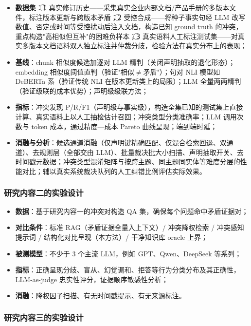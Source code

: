 \begin{itemize}
  \item \textbf{数据集}：\textcircled{1} 真实修订历史——采集真实企业内部文档/产品手册的多版本文件，标注版本更新与跨版本矛盾；\textcircled{2} 受控合成——将种子事实句经 LLM 改写数值、否定或时间等受控扰动后注入文档，构造已知 ground truth 的冲突，重点构造"高相似但互补"的困难负样本；\textcircled{3} 真实语料人工标注测试集——对真实多版本文档语料双人独立标注并仲裁分歧，检验方法在真实分布上的表现；
  \item \textbf{基线}：chunk 相似度候选加逐对 LLM 精判（关闭声明抽取的退化形态）；embedding 相似度阈值直判（验证"相似$\neq$矛盾"）；句对 NLI 模型如 DeBERTa 系（验证传统 NLI 在版本更新类上的局限）；LLM 全量两两精判（验证级联的成本优势）；声明级级联方法；
  \item \textbf{指标}：冲突发现 P/R/F1（声明级与事实级），构造全集已知的测试集上直接计算、真实语料上以人工抽检估计召回；冲突类型分类准确率；LLM 调用次数与 token 成本，通过精度—成本 Pareto 曲线呈现；端到端时延；
  \item \textbf{消融与分析}：候选通道消融（仅声明键精确匹配、仅混合检索回退、双通道）、去规则层（全部交由 LLM）、批量裁决批大小扫描、声明抽取开关、去时间戳元数据；冲突类型混淆矩阵与按跨主题、同主题同实体等难度分层的性能对比；辅以真实系统裁决队列的人工纠错比例评估实际效果。
\end{itemize}

\subsubsection{研究内容二的实验设计}

\begin{itemize}
  \item \textbf{数据}：基于研究内容一的冲突对构造 QA 集，确保每个问题命中矛盾证据对；
  \item \textbf{对比条件}：标准 RAG（矛盾证据全量入上下文）/ 冲突降权检索 / 冲突感知提示词 / 结构化对比呈现（本方法）/ 干净知识库 oracle 上界；
  \item \textbf{被测模型}：不少于 3 个主流 LLM，例如 GPT、Qwen、DeepSeek 等系列；
  \item \textbf{指标}：正确呈现分歧、盲从、幻觉调和、拒答等行为分类分布及其正确性，LLM-as-judge 忠实性评分，证据顺序敏感性分析；
  \item \textbf{消融}：降权因子扫描、有无时间戳提示、有无来源标注。
\end{itemize}

\subsubsection{研究内容三的实验设计}

